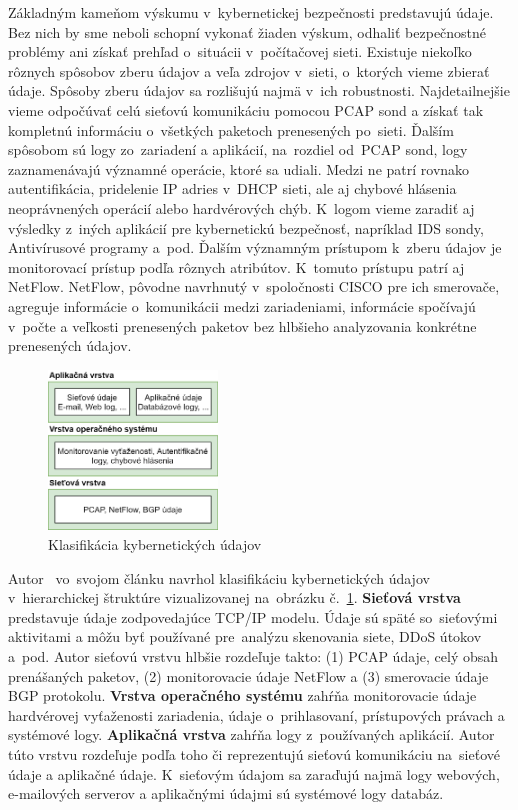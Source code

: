\documentclass[thesismargins, thesislinespacing, openright, upjsfrontpage]{rnthesis}
\begin{document}
Základným kameňom výskumu v~kybernetickej bezpečnosti predstavujú údaje. Bez nich by sme neboli schopní vykonať žiaden výskum, odhaliť bezpečnostné problémy ani získať prehľad o~situácii v~počítačovej sieti. Existuje niekoľko rôznych spôsobov zberu údajov a veľa zdrojov v~sieti, o~ktorých vieme zbierať údaje. Spôsoby zberu údajov sa rozlišujú najmä v~ich robustnosti. Najdetailnejšie vieme odpočúvať celú sieťovú komunikáciu pomocou PCAP sond a získať tak kompletnú informáciu o~všetkých paketoch prenesených po~sieti. Ďalším spôsobom sú logy zo~zariadení a aplikácií, na~rozdiel od~PCAP sond, logy zaznamenávajú významné operácie, ktoré sa udiali. Medzi ne patrí rovnako autentifikácia, pridelenie IP adries v~DHCP sieti, ale aj chybové hlásenia neoprávnených operácií alebo hardvérových chýb. K~logom vieme zaradiť aj výsledky z~iných aplikácií pre kybernetickú bezpečnosť, napríklad IDS sondy, Antivírusové programy a~pod. Ďalším významným prístupom k~zberu údajov je monitorovací prístup podľa rôznych atribútov. K~tomuto prístupu patrí aj NetFlow. NetFlow, pôvodne navrhnutý v~spoločnosti CISCO pre ich smerovače, agreguje informácie o~komunikácii medzi zariadeniami, informácie spočívajú v~počte a veľkosti prenesených paketov bez hlbšieho analyzovania konkrétne prenesených údajov.

\begin{figure}[h]
  \centering
  \includegraphics[width=0.4\textwidth]{images/cyberdata.png}
  \caption{Klasifikácia kybernetických údajov}
  \label{fig:cyberdata}
\end{figure}

Autor~\cite{wang2013cyber} vo~svojom článku navrhol klasifikáciu kybernetických údajov v~hierarchickej štruktúre vizualizovanej na~obrázku č.~\ref{fig:cyberdata}. \textbf{Sieťová vrstva} predstavuje údaje zodpovedajúce TCP/IP modelu. Údaje sú späté so~sieťovými aktivitami a môžu byť používané pre~analýzu skenovania siete, DDoS útokov a~pod. Autor sieťovú vrstvu hlbšie rozdeľuje takto: (1) PCAP údaje, celý obsah prenášaných paketov, (2) monitorovacie údaje NetFlow a (3) smerovacie údaje BGP protokolu. \textbf{Vrstva operačného systému} zahŕňa monitorovacie údaje hardvérovej vyťaženosti zariadenia, údaje o~prihlasovaní, prístupových právach a systémové logy. \textbf{Aplikačná vrstva} zahŕňa logy z~používaných aplikácií. Autor túto vrstvu rozdeľuje podľa toho či reprezentujú sieťovú komunikáciu na~sieťové údaje a aplikačné údaje. K~sieťovým údajom sa zaraďujú najmä logy webových, e-mailových serverov a aplikačnými údajmi sú systémové logy databáz.
\end{document}
